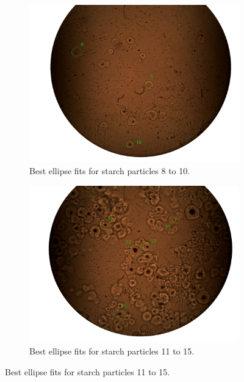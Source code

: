 \begin{figure}[h!]
    \medskip
    \begin{subfigure}[b]{0.475\textwidth}
        \centering
        \includegraphics[width=\textwidth, frame]{afbeeldingen/size/zetmeel/zetmeel_3.png}
        \caption{Best ellipse fits for starch particles 8 to 10.}   
        \label{fig_zetmeel_3}
    \end{subfigure}
    \hspace*{\fill}
    \begin{subfigure}[b]{0.475\textwidth}
        \centering
        \includegraphics[width=\textwidth, frame]{afbeeldingen/size/zetmeel/zetmeel_4.png}
        \caption{Best ellipse fits for starch particles 11 to 15.}   
        \label{fig_zetmeel_4}
    \end{subfigure}
    

\end{figure}
